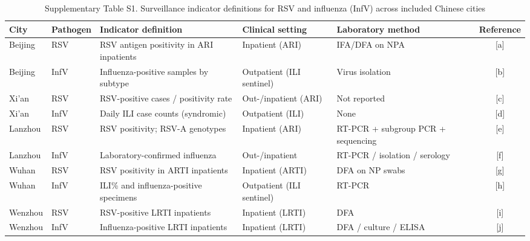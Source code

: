 \begin{landscape}
\begin{table}[htbp]
    \centering
    \small
    \renewcommand{\arraystretch}{1.25}
    \begin{threeparttable}
    \caption{Supplementary Table S1. Surveillance indicator definitions for RSV and influenza (InfV) across included Chinese cities}
    \begin{tabularx}{\textwidth}{@{}l l X X X c@{}}
    \toprule
    City & Pathogen & Indicator definition & Clinical setting & Laboratory method & Reference \\ 
    \midrule
    
    Beijing & RSV  & RSV antigen positivity in ARI inpatients              & Inpatient (ARI)                  & IFA/DFA on NPA                                & [a] \\
    Beijing & InfV & Influenza-positive samples by subtype                 & Outpatient (ILI sentinel)        & Virus isolation                               & [b] \\
    
    Xi'an   & RSV  & RSV-positive cases / positivity rate                  & Out-/inpatient (ARI)             & Not reported                                   & [c] \\
    Xi'an   & InfV & Daily ILI case counts (syndromic)                     & Outpatient (ILI)                 & None                                           & [d] \\
    
    Lanzhou & RSV  & RSV positivity; RSV-A genotypes                       & Inpatient (ARI)                  & RT-PCR + subgroup PCR + sequencing            & [e] \\
    Lanzhou & InfV & Laboratory-confirmed influenza                         & Out-/inpatient                   & RT-PCR / isolation / serology                 & [f] \\
    
    Wuhan   & RSV  & RSV positivity in ARTI inpatients                     & Inpatient (ARTI)                 & DFA on NP swabs                               & [g] \\
    Wuhan   & InfV & ILI\% and influenza-positive specimens                & Outpatient (ILI sentinel)        & RT-PCR                                        & [h] \\
    
    Wenzhou & RSV  & RSV-positive LRTI inpatients                          & Inpatient (LRTI)                 & DFA                                            & [i] \\
    Wenzhou & InfV & Influenza-positive LRTI inpatients                    & Inpatient (LRTI)                 & DFA / culture / ELISA                         & [j] \\
    

\end{tabularx}
\end{threeparttable}
\end{table}
\end{landscape}
